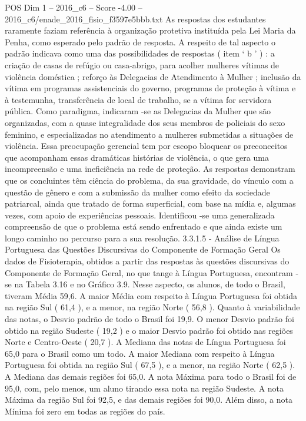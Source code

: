 \begin{textsample}{POS Dim 1 – 2016\_c6 – Score -4.00 – 2016\_c6/enade\_2016\_fisio\_f3597e5bbb.txt}
As respostas dos estudantes raramente faziam referência à organização protetiva instituída pela Lei Maria da Penha, como esperado pelo padrão de resposta.
A respeito de tal aspecto o padrão indicava como uma das possibilidades de respostas ( item ‘ b ’ ) : a criação de casas de refúgio ou casa-abrigo, para acolher mulheres vítimas de violência doméstica ; reforço às Delegacias de Atendimento à Mulher ; inclusão da vítima em programas assistenciais do governo, programas de proteção à vítima e à testemunha, transferência de local de trabalho, se a vítima for servidora pública.
Como paradigma, indicaram -se as Delegacias da Mulher que são organizadas, com a quase integralidade dos seus membros de policiais do sexo feminino, e especializadas no atendimento a mulheres submetidas a situações de violência.
Essa preocupação gerencial tem por escopo bloquear os preconceitos que acompanham essas dramáticas histórias de violência, o que gera uma incompreensão e uma ineficiência na rede de proteção.
As respostas demonstram que os concluintes têm ciência do problema, da sua gravidade, do vínculo com a questão de gênero e com a submissão da mulher como efeito da sociedade patriarcal, ainda que tratado de forma superficial, com base na mídia e, algumas vezes, com apoio de experiências pessoais.
Identificou -se uma generalizada compreensão de que o problema está sendo enfrentado e que ainda existe um longo caminho no percurso para a sua resolução. 3.3.1.5 - Análise de Língua Portuguesa das Questões Discursivas do Componente de Formação Geral Os dados de Fisioterapia, obtidos a partir das respostas às questões discursivas do Componente de Formação Geral, no que tange à Língua Portuguesa, encontram -se na Tabela 3.16 e no Gráfico 3.9.
Nesse aspecto, os alunos, de todo o Brasil, tiveram Média 59,6.
A maior Média com respeito à Língua Portuguesa foi obtida na região Sul ( 61,4 ), e a menor, na região Norte ( 56,8 ).
Quanto à variabilidade das notas, o Desvio padrão de todo o Brasil foi 19,9.
O menor Desvio padrão foi obtido na região Sudeste ( 19,2 ) e o maior Desvio padrão foi obtido nas regiões Norte e Centro-Oeste ( 20,7 ).
A Mediana das notas de Língua Portuguesa foi 65,0 para o Brasil como um todo.
A maior Mediana com respeito à Língua Portuguesa foi obtida na região Sul ( 67,5 ), e a menor, na região Norte ( 62,5 ).
A Mediana das demais regiões foi 65,0.
A nota Máxima para todo o Brasil foi de 95,0, com, pelo menos, um aluno tirando essa nota na região Sudeste.
A nota Máxima da região Sul foi 92,5, e das demais regiões foi 90,0.
Além disso, a nota Mínima foi zero em todas as regiões do país.

\end{textsample}
